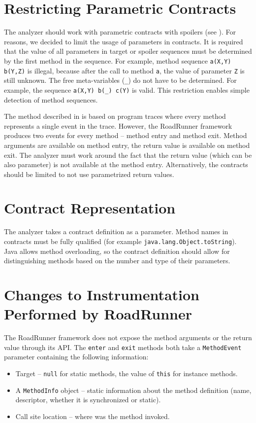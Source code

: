 \section{Restricting Parametric Contracts}

The analyzer should work with parametric contracts with spoilers (see
). For  reasons, we decided to limit the usage of
parameters in contracts. It is required that the value of all parameters in
target or spoiler sequences must be determined by the first method in the
sequence. For example, method sequence \texttt{a(X,Y) b(Y,Z)} is illegal,
because after the call to method \texttt{a}, the value of parameter \texttt{Z}
is still unknown. The free meta-variables (\texttt{\_}) do not have to be
determined. For example, the sequence \texttt{a(X,Y) b(\_) c(Y)} is valid. This
restriction enables simple detection of method sequences. 

The method described in \cite{contracts} is based on program traces where
every method represents a single event in the trace. However, the RoadRunner
framework produces two events for every method -- method entry and method exit.
Method arguments are available on method entry, the return value is available on
method exit. The analyzer must work around the fact that the return value (which
can be also parameter) is not available at the method entry. Alternatively, the
contracts should be limited to not use parametrized return values.

\section{Contract Representation}

The analyzer takes a contract definition as a parameter. Method names in
contracts must be fully qualified (for example
\texttt{java.lang.Object.toString}). Java allows method overloading, so the
contract definition should allow for distinguishing methods based on the number
and type of their parameters.


\section{Changes to Instrumentation Performed by RoadRunner}

The RoadRunner framework does not expose the method arguments or the return
value through its API. The \texttt{enter} and \texttt{exit} methods both take a
\texttt{MethodEvent} parameter containing the following information:
\begin{itemize}
    \item Target -- \texttt{null} for static methods, the value of \texttt{this}
        for instance methods.
    \item A \texttt{MethodInfo} object -- static information about the method
        definition (name, descriptor, whether it is synchronized or static).
    \item Call site location -- where was the method invoked.
\end{itemize}

